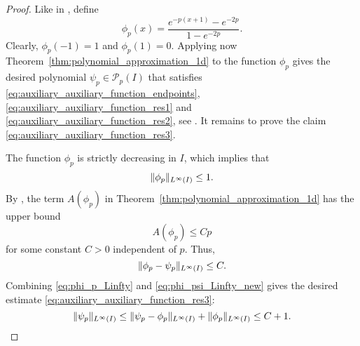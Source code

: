 \documentclass[english, 12pt, a4paper, sci, utf8, a-2b, online]{aaltothesis}
\theoremstyle{definition}
\theoremstyle{plain}
\DeclarePairedDelimiter\norm{\lVert}{\rVert}
\numberwithin{equation}{section}
\begin{document}
\begin{proof}
    Like in \cite{babuskasuri1987}, define
    \begin{equation*}
        \phi_p(x) = \frac{e^{-p(x+1)} - e^{-2p}}{1 - e^{-2p}}.
    \end{equation*}
    Clearly, $\phi_p(-1)=1$ and $\phi_p(1)=0$.
    Applying now Theorem~\ref{thm:polynomial_approximation_1d} to the function $\phi_p$
    gives the desired polynomial $\psi_p \in \mathcal{P}_p(I)$ that satisfies
    \eqref{eq:auxiliary_auxiliary_function_endpoints},
    \eqref{eq:auxiliary_auxiliary_function_res1} and
    \eqref{eq:auxiliary_auxiliary_function_res2}, see \cite{babuskasuri1987}.
    It remains to prove the claim \eqref{eq:auxiliary_auxiliary_function_res3}.

    The function $\phi_p$ is strictly decreasing in $I$, which implies that
    \begin{equation}
        \label{eq:phi_p_Linfty}
        \norm{\phi_p}_{L^{\infty}(I)} \leq 1.
    \end{equation}
    By \cite{babuskasuri1987}, the term $A(\phi_p)$ in
    Theorem~\ref{thm:polynomial_approximation_1d} has the upper bound
    \begin{equation*}
        A(\phi_p) \leq C p
    \end{equation*}
    for some constant $C > 0$ independent of $p$. Thus,
    \begin{equation}
        \label{eq:phi_psi_Linfty_new}
        \norm{\phi_p-\psi_p}_{L^{\infty}(I)} \leq C.
    \end{equation}
    Combining \eqref{eq:phi_p_Linfty} and \eqref{eq:phi_psi_Linfty_new} gives
    the desired estimate \eqref{eq:auxiliary_auxiliary_function_res3}:
    \begin{equation*}
        \norm{\psi_p}_{L^{\infty}(I)}
        \leq \norm{\psi_p - \phi_p}_{L^{\infty}(I)} + \norm{\phi_p}_{L^{\infty}(I)}
        \leq C + 1.
    \end{equation*}
\end{proof}
\end{document}
